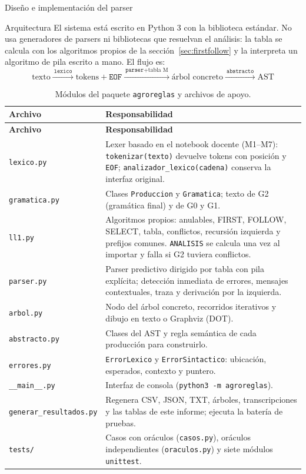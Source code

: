 \documentclass[11pt,letterpaper]{article}
\makeatletter
\renewcommand\section{\@startsection{section}{1}{\z@}{-3.2ex \@plus -1ex \@minus -.2ex}{1.6ex \@plus .2ex}%
  {\normalfont\Large\bfseries\color{acento}}}
\renewcommand\subsection{\@startsection{subsection}{2}{\z@}{-2.6ex\@plus -1ex \@minus -.2ex}{1.0ex \@plus .2ex}%
  {\normalfont\large\bfseries}}
\newcommand{\cod}[1]{\texttt{#1}}
\newcommand{\ruta}[1]{\nolinkurl{#1}}
\newcommand{\cabeza}{\rowcolor{cabecera}}
\makeatother
\begin{document}
\section{Diseño e implementación del parser}\label{sec:parser}

\subsection{Arquitectura}
El sistema está escrito en Python 3 con la biblioteca estándar. No usa generadores de parsers ni bibliotecas que
resuelvan el análisis: la tabla se calcula con los algoritmos propios de la sección~\ref{sec:firstfollow} y la
interpreta un algoritmo de pila escrito a mano. El flujo es:
\[ \text{texto} \xrightarrow{\ \texttt{lexico}\ } \text{tokens} + \texttt{EOF}
   \xrightarrow{\ \texttt{parser} + \text{tabla M}\ } \text{árbol concreto}
   \xrightarrow{\ \texttt{abstracto}\ } \text{AST} \]

\begin{longtable}{>{\raggedright}p{3.6cm}p{12.2cm}}
\caption{Módulos del paquete \cod{agroreglas} y archivos de apoyo.}\\
\hline\cabeza \textbf{Archivo} & \textbf{Responsabilidad}\\\hline\endfirsthead
\hline\cabeza \textbf{Archivo} & \textbf{Responsabilidad}\\\hline\endhead
\cod{lexico.py} & Lexer basado en el notebook docente (M1--M7): \cod{tokenizar(texto)} devuelve tokens con
posición y \cod{EOF}; \ruta{analizador_lexico(cadena)} conserva la interfaz original.\\
\cod{gramatica.py} & Clases \cod{Produccion} y \cod{Gramatica}; texto de G2 (gramática final) y de G0 y G1.\\
\cod{ll1.py} & Algoritmos propios: anulables, FIRST, FOLLOW, SELECT, tabla, conflictos, recursión izquierda
y prefijos comunes. \cod{ANALISIS} se calcula una vez al importar y falla si G2 tuviera conflictos.\\
\cod{parser.py} & Parser predictivo dirigido por tabla con pila explícita; detección inmediata de errores,
mensajes contextuales, traza y derivación por la izquierda.\\
\cod{arbol.py} & Nodo del árbol concreto, recorridos iterativos y dibujo en texto o Graphviz (DOT).\\
\cod{abstracto.py} & Clases del AST y regla semántica de cada producción para construirlo.\\
\cod{errores.py} & \cod{ErrorLexico} y \cod{ErrorSintactico}: ubicación, esperados, contexto y puntero.\\
\ruta{__main__.py} & Interfaz de consola (\cod{python3 -m agroreglas}).\\
\ruta{generar_resultados.py} & Regenera CSV, JSON, TXT, árboles, transcripciones y las tablas de este informe;
ejecuta la batería de pruebas.\\
\ruta{tests/} & Casos con oráculos (\cod{casos.py}), oráculos independientes (\cod{oraculos.py}) y siete módulos
\cod{unittest}.\\\hline
\end{longtable}
\end{document}
